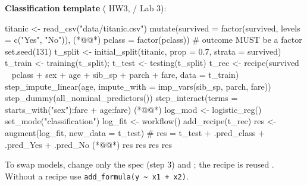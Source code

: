 \textbf{Classification template} ( HW3, / Lab 3):
\begin{rcode}
titanic <- read_csv("data/titanic.csv") %
  mutate(survived = factor(survived, levels = c("Yes", "No")), (*@@*)
         pclass = factor(pclass))   # outcome MUST be a factor
set.seed(131)
t_split <- initial_split(titanic, prop = 0.7, strata = survived)
t_train <- training(t_split); t_test <- testing(t_split)
t_rec <- recipe(survived ~ pclass + sex + age + sib_sp +
                  parch + fare, data = t_train) %
  step_impute_linear(age, impute_with = imp_vars(sib_sp, parch, fare)) %
  step_dummy(all_nominal_predictors()) %
  step_interact(terms = ~ starts_with("sex"):fare + age:fare) (*@@*)
log_mod <- logistic_reg() %
  set_mode("classification")
log_fit <- workflow() %
  add_recipe(t_rec) %
res <- augment(log_fit, new_data = t_test)
# res = t_test + .pred_class + .pred_Yes + .pred_No (*@@*)
res %
res %
res %
res %
\end{rcode}
To swap models, change only the spec (step 3) and ; the recipe is reused .
Without a recipe use \texttt{add\_formula(y \textasciitilde{} x1 + x2)}.

